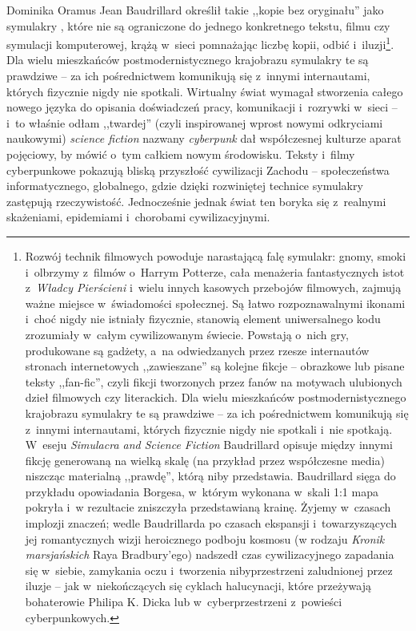 \begin{artplenv}{Dominika Oramus}
Jean Baudrillard określił takie ,,kopie bez oryginału'' jako symulakry
\parencite[][]{baudrillard_symulakry_2005}, %
 które nie są ograniczone do jednego konkretnego tekstu, filmu czy symulacji komputerowej, krążą w~sieci pomnażając liczbę kopii, odbić i~iluzji\footnote{Rozwój technik filmowych powoduje narastającą falę symulakr: gnomy, smoki i~olbrzymy z~filmów o~Harrym Potterze, cała menażeria fantastycznych istot z~\textit{Władcy Pierścieni} i~wielu innych kasowych przebojów filmowych, zajmują ważne miejsce w~świadomości społecznej. Są łatwo rozpoznawalnymi ikonami i~choć nigdy nie istniały fizycznie, stanowią element uniwersalnego kodu zrozumiały w~całym cywilizowanym świecie. Powstają o~nich gry, produkowane są gadżety, a~na odwiedzanych przez rzesze internautów stronach internetowych ,,zawieszane'' są kolejne fikcje -- obrazkowe lub pisane teksty ,,fan-fic'', czyli fikcji tworzonych przez fanów na motywach ulubionych dzieł filmowych czy literackich. Dla wielu mieszkańców postmodernistycznego krajobrazu symulakry te są prawdziwe -- za ich pośrednictwem komunikują się z~innymi internautami, których fizycznie nigdy nie spotkali i~nie spotkają. W~eseju \textit{Simulacra and Science Fiction} Baudrillard opisuje między innymi fikcję generowaną na wielką skalę (na przykład przez współczesne media) niszcząc materialną ,,prawdę'', którą niby przedstawia. Baudrillard sięga do przykładu opowiadania Borgesa, w~którym wykonana w~skali 1:1 mapa pokryła i~w rezultacie zniszczyła przedstawianą krainę. Żyjemy w~czasach implozji znaczeń; wedle Baudrillarda po czasach ekspansji i~towarzyszących jej romantycznych wizji heroicznego podboju kosmosu (w rodzaju \textit{Kronik marsjańskich} Raya Bradbury’ego) nadszedł czas cywilizacyjnego zapadania się w~siebie, zamykania oczu i~tworzenia nibyprzestrzeni zaludnionej przez iluzje -- jak w~niekończących się cyklach halucynacji, które przeżywają bohaterowie Philipa K. Dicka lub w~cyberprzestrzeni z~powieści cyberpunkowych.}. Dla wielu mieszkańców postmodernistycznego krajobrazu symulakry te są prawdziwe -- za ich pośrednictwem komunikują się z~innymi internautami, których fizycznie nigdy nie spotkali. Wirtualny świat wymagał stworzenia całego nowego języka do opisania doświadczeń pracy, komunikacji i~rozrywki w~sieci -- i~to właśnie odłam ,,twardej'' (czyli inspirowanej wprost nowymi odkryciami naukowymi) \textit{science fiction} nazwany \textit{cyberpunk} dał współczesnej kulturze aparat pojęciowy, by mówić o~tym całkiem nowym środowisku. Teksty i~filmy cyberpunkowe pokazują bliską przyszłość cywilizacji Zachodu -- społeczeństwa informatycznego, globalnego, gdzie dzięki rozwiniętej technice symulakry zastępują rzeczywistość. Jednocześnie jednak świat ten boryka się z~realnymi skażeniami, epidemiami i~chorobami cywilizacyjnymi.


\end{artplenv}
